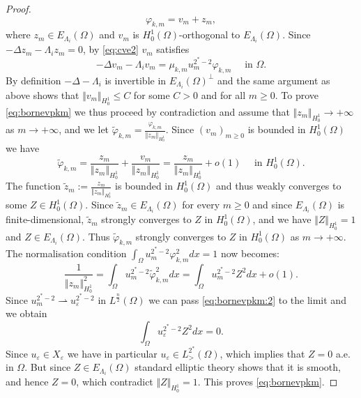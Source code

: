 \documentclass[10pt,a4paper]{amsart}
\newcommand{\Om}{\Omega}
\newcommand{\ve}{\varepsilon}
\newcommand{\vp}{\varphi}
\begin{document}
\begin{proof}
$$ \vp_{k,m} = v_m + z_m, $$
where $z_m \in E_{\Lambda_i}(\Om)$ and $v_m$ is $H^1_0(\Om)$-orthogonal to $E_{\Lambda_i}(\Om)$. Since $-\Delta z_m - \Lambda_i z_m = 0$, by \eqref{eq:cve2} $v_m$ satisfies 
\begin{equation*} 
 - \Delta v_m - \Lambda_i v_m = \mu_{k,m} u_m^{2^*-2} \vp_{k,m} \quad \text{ in } \Om. 
 \end{equation*}
By definition $- \Delta-\Lambda_i$ is invertible in $E_{\Lambda_i}(\Om)^{\perp}$ and the same argument as above shows that $\Vert v_m \Vert_{H^1_0} \le C $ for some $C>0$ and for all $m \ge 0$. To prove \eqref{eq:bornevpkm} we thus proceed by contradiction and assume that $\Vert z_m \Vert_{H^1_0} \to + \infty$ as $m \to + \infty$, and we let $\tilde{\vp}_{k,m} = \frac{\vp_{k,m}}{\Vert z_m\Vert_{H^1_0}}$. Since $(v_m)_{m \ge0}$ is bounded in $H^1_0(\Om)$ we have 
$$ \tilde{\vp}_{k,m} = \frac{z_m}{\Vert z_m\Vert_{H^1_0}} + \frac{v_m}{\Vert z_m\Vert_{H^1_0}} = \frac{z_m}{\Vert z_m\Vert_{H^1_0}}  + o(1) \quad \text{ in } H^1_0(\Om). $$
The function  $ \tilde{z}_m:=\frac{z_m}{\Vert z_m\Vert_{H^1_0}}$ is bounded in $H^1_0(\Om)$ and thus weakly converges to some $Z \in H^1_0(\Om)$. Since $\tilde{z}_m \in E_{\Lambda_i}(\Om)$ for every $m \ge 0$ and since $E_{\Lambda_i}(\Om)$ is finite-dimensional, $\tilde{z}_m$ strongly converges to $Z$ in $H^1_0(\Om)$, and we have $\Vert Z \Vert_{H^1_0} =1$ and $Z \in E_{\Lambda_i}(\Om)$. Thus $\tilde{\vp}_{k,m}$ strongly converges to $Z$ in $H^1_0(\Om)$ as $m \to + \infty$. The normalisation condition $\int_{\Om} u_m^{2^*-2} \vp_{k,m}^2dx = 1$ now becomes:
\begin{equation} \label{eq:bornevpkm:2}
 \frac{1}{\Vert z_m \Vert_{H^1_0}^2} =  \int_{\Om} u_m^{2^*-2} \tilde{\vp}_{k,m}^2dx = \int_{\Om} u_m^{2^*-2} Z^2dx + o(1). 
 \end{equation}
Since $u_m^{2^*-2} \rightharpoonup u_{\ve}^{2^*-2}$ in $L^{\frac{n}{2}}(\Om)$ we can pass \eqref{eq:bornevpkm:2} to the limit  and we obtain 
$$ \int_{\Om} u_\ve^{2^*-2} Z^2dx = 0. $$
Since $u_\ve \in X_\ve$ we have in particular $u_\ve \in L^{2^*}_{>}(\Om)$, which implies that $Z = 0$ a.e. in $\Om$. But since $Z \in E_{\Lambda_i}(\Om)$ standard elliptic theory shows that it is smooth, and hence $Z = 0$, which contradict $\Vert Z \Vert_{H^1_0} = 1$. This proves \eqref{eq:bornevpkm}. 



\end{proof}
\end{document}
